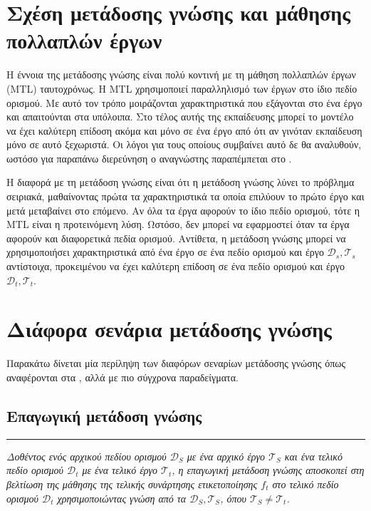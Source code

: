 \section{Σχέση μετάδοσης γνώσης και μάθησης πολλαπλών έργων}
Η έννοια της μετάδοσης γνώσης είναι πολύ κοντινή με τη μάθηση πολλαπλών έργων (MTL) ταυτοχρόνως. Η MTL χρησιμοποιεί παραλληλισμό των έργων στο ίδιο πεδίο ορισμού. Με αυτό τον τρόπο μοιράζονται χαρακτηριστικά που εξάγονται στο ένα έργο και απαιτούνται στα υπόλοιπα. Στο τέλος αυτής της εκπαίδευσης μπορεί το μοντέλο να έχει καλύτερη επίδοση ακόμα και μόνο σε ένα έργο από ότι αν γινόταν εκπαίδευση μόνο σε αυτό ξεχωριστά. Οι λόγοι για τους οποίους συμβαίνει αυτό δε θα αναλυθούν, ωστόσο για παραπάνω διερεύνηση ο αναγνώστης παραπέμπεται στο \cite{43}. 

Η διαφορά με τη μετάδοση γνώσης είναι ότι η μετάδοση γνώσης λύνει το πρόβλημα σειριακά, μαθαίνοντας πρώτα τα χαρακτηριστικά τα οποία επιλύουν το πρώτο έργο και μετά μεταβαίνει στο επόμενο. Αν όλα τα έργα αφορούν το ίδιο πεδίο ορισμού, τότε η MTL είναι η προτεινόμενη λύση. Ωστόσο, δεν μπορεί να εφαρμοστεί όταν τα έργα αφορούν και διαφορετικά πεδία ορισμού. Αντίθετα, η μετάδοση γνώσης μπορεί να χρησιμοποιήσει χαρακτηριστικά από ένα έργο σε ένα πεδίο ορισμού και έργο $ \mathcal{D}_s, \mathcal{T}_s $ αντίστοιχα, προκειμένου να έχει καλύτερη επίδοση σε ένα πεδίο ορισμού και έργο $ \mathcal{D}_t, \mathcal{T}_t $.

\section{Διάφορα σενάρια μετάδοσης γνώσης }
Παρακάτω δίνεται μία περίληψη των διαφόρων σεναρίων μετάδοσης γνώσης όπως αναφέρονται στα \cite{38} \cite{40}, αλλά με πιο σύγχρονα παραδείγματα.

\subsection{Επαγωγική μετάδοση γνώσης}
{ \rule{1ex}{1ex} }%
\textit{Δοθέντος ενός αρχικού πεδίου ορισμού $\mathcal{D}_S$ με ένα αρχικό έργο $\mathcal{T}_S$ και ένα τελικό πεδίο ορισμού $\mathcal{D}_t$ με ένα τελικό έργο $\mathcal{T}_t$, η επαγωγική μετάδοση γνώσης αποσκοπεί στη βελτίωση της μάθησης της τελικής συνάρτησης ετικετοποίησης $f_t$ στο τελικό πεδίο ορισμού $\mathcal{D}_t$ χρησιμοποιώντας γνώση από τα $\mathcal{D}_S, \mathcal{T}_S$, όπου $\mathcal{T}_S \neq \mathcal{T}_t$.}

